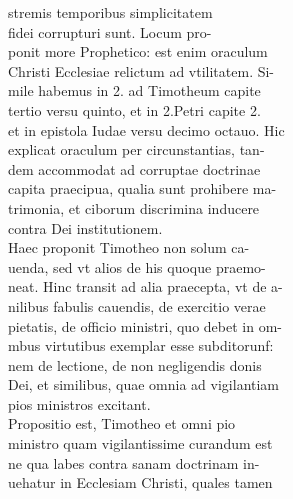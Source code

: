 \documentclass{article}
\begin{document}
\begin{pages}
                stremis temporibus simplicitatem \\
                fidei corrupturi sunt. Locum pro- \\
                ponit more Prophetico: est enim oraculum \\
                Christi Ecclesiae relictum ad vtilitatem. Si- \\
                mile habemus in 2. ad Timotheum capite \\
                tertio versu quinto, et in 2.Petri capite 2. \\
                et in epistola Iudae versu decimo octauo. Hic \\
                explicat oraculum per circunstantias, tan- \\
                dem accommodat ad corruptae doctrinae \\
                capita praecipua, qualia sunt prohibere ma- \\
                trimonia, et ciborum discrimina inducere \\
                contra Dei institutionem. \\
                Haec proponit Timotheo non solum ca- \\
                uenda, sed vt alios de his quoque praemo- \\
                neat. Hinc transit ad alia praecepta, vt de a- \\
                nilibus fabulis cauendis, de exercitio verae \\
                pietatis, de officio ministri, quo debet in om- \\
                mbus virtutibus exemplar esse subditorunf: \\
                nem de lectione, de non negligendis donis \\
                Dei, et similibus, quae omnia ad vigilantiam \\
                pios ministros excitant. \\
                Propositio est, Timotheo et omni pio \\
                ministro quam vigilantissime curandum est \\
                ne qua labes contra sanam doctrinam in- \\
                uehatur in Ecclesiam Christi, quales tamen \\

\end{pages}
\end{document}
